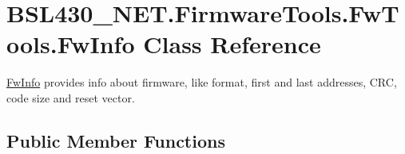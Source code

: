 \hypertarget{class_b_s_l430___n_e_t_1_1_firmware_tools_1_1_fw_tools_1_1_fw_info}{}\section{B\+S\+L430\+\_\+\+N\+E\+T.\+Firmware\+Tools.\+Fw\+Tools.\+Fw\+Info Class Reference}
\label{class_b_s_l430___n_e_t_1_1_firmware_tools_1_1_fw_tools_1_1_fw_info}


\mbox{\hyperlink{class_b_s_l430___n_e_t_1_1_firmware_tools_1_1_fw_tools_1_1_fw_info}{Fw\+Info}} provides info about firmware, like format, first and last addresses, C\+RC, code size and reset vector.  


\subsection*{Public Member Functions}
